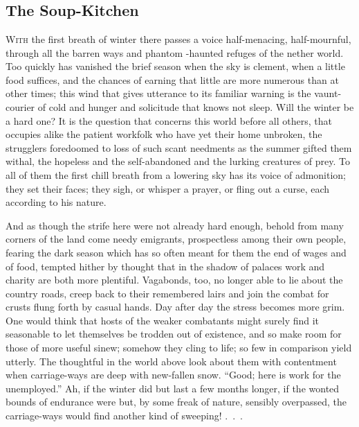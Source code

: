\part{}

\chapter{The Soup-Kitchen}

\textsc{With} the first breath of winter there passes a voice
half-menacing, half-mournful, through all the barren ways and phantom
-haunted refuges of the nether world. Too quickly has vanished the brief
season when the sky is clement, when a little food suffices, and the
chances of earning that little are more numerous than at other times;
this wind that gives utterance to its familiar warning is the
vaunt-courier of cold and hunger and solicitude that knows not sleep.
Will the winter be a hard one? It is the question that concerns this
world before all others, that occupies alike the patient workfolk who
have yet their home unbroken, the strugglers foredoomed to loss of such
scant needments as the summer gifted {\protect\hypertarget{2}{}{}}them
withal, the hopeless and the self-abandoned and the lurking creatures of
prey. To all of them the first chill breath from a lowering sky has its
voice of admonition; they set their faces; they sigh, or whisper a
prayer, or fling out a curse, each according to his nature.

And as though the strife here were not already hard enough, behold from
many corners of the land come needy emigrants, prospectless among their
own people, fearing the dark season which has so often meant for them
the end of wages and of food, tempted hither by thought that in the
shadow of palaces work and charity are both more plentiful. Vagabonds,
too, no longer able to lie about the country roads, creep back to their
remembered lairs and join the combat for crusts flung forth by casual
hands. Day after day the stress becomes more grim. One would think that
hosts of the weaker combatants might surely find it seasonable to let
themselves be trodden out of existence, and so make room for those of
more useful sinew; somehow they cling to life; so few in comparison
yield utterly. The thoughtful in the world above look about them with
contentment when carriage-ways are deep
{\protect\hypertarget{3}{}{}}with new-fallen snow. ``Good; here is work
for the unemployed.'' Ah, if the winter did but last a few months
longer, if the wonted bounds of endurance were but, by some freak of
nature, sensibly overpassed, the carriage-ways would find another kind
of {sweeping! {.~.~.}}

